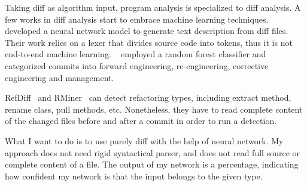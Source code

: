 Taking diff as algorithm input, program analysis is specialized to diff analysis.
A few works in diff analysis start to embrace machine learning techniques.
~\cite{loyola2017neural} developed a neural network model to generate text description from diff files.
Their work relies on a lexer that divides source code into tokens,
thus it is not end-to-end machine learning.
~\cite{macho2016predicting} employed a random forest classifier and categorized commits into forward engineering, re-engineering, corrective engineering and management.

RefDiff~\cite{silva2020refdiff} and RMiner~\cite{tsantalis2018accurate} can detect refactoring types, including extract method, rename class, pull methods, etc. Nonetheless, they have to read complete content of the changed files before and after a commit in order to run a detection.

What I want to do is to use purely diff with the help of neural network. My approach does not need rigid syntactical parser, and does not read full source or complete content of a file. The output of my network is a percentage, indicating how confident my network is that the input belongs to the given type.

